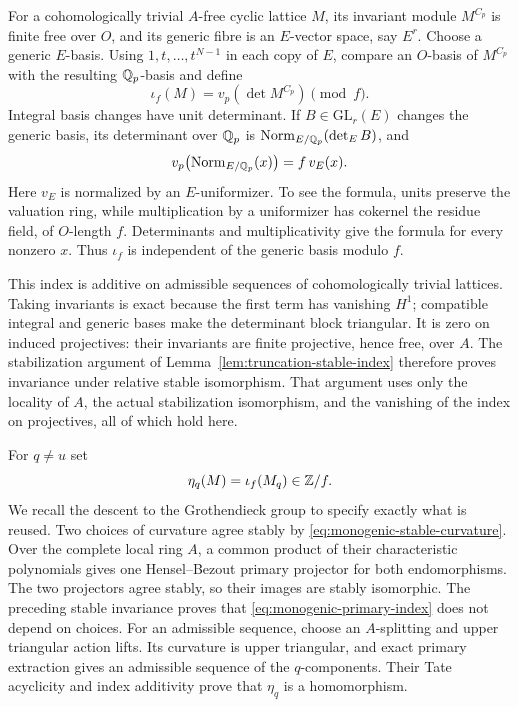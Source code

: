 For a cohomologically trivial $A$-free cyclic lattice $M$, its invariant
module $M^{C_p}$ is finite free over $O$, and its generic fibre is
an $E$-vector space, say $E^r$.  Choose a generic $E$-basis.  Using
$1,t,\ldots,t^{N-1}$ in each copy of $E$, compare an $O$-basis of
$M^{C_p}$ with the resulting $\mathbb Q_p$-basis and define
\[
 \iota_f(M)=v_p(\det M^{C_p})\pmod f.
\]
Integral basis changes have unit determinant.  If $B\in\mathrm{GL}_r(E)$
changes the generic basis, its determinant over $\mathbb Q_p$ is
$\operatorname{Norm}_{E/\mathbb Q_p}(\det_E B)$, and
\begin{equation}\label{eq:monogenic-norm-valuation}
 v_p\bigl(\operatorname{Norm}_{E/\mathbb Q_p}(x)\bigr)=f\,v_E(x).
\end{equation}
Here $v_E$ is normalized by an $E$-uniformizer.  To see the formula,
units preserve the valuation ring, while multiplication by a
uniformizer has cokernel the residue field, of $O$-length $f$.
Determinants and multiplicativity give the formula for every nonzero
$x$.  Thus $\iota_f$ is independent of the generic basis modulo $f$.

This index is additive on admissible sequences of cohomologically
trivial lattices.  Taking invariants is exact because the first term
has vanishing $H^1$; compatible integral and generic bases make the
determinant block triangular.  It is zero on induced projectives:
their invariants are finite projective, hence free, over $A$.
The stabilization argument of
Lemma~\ref{lem:truncation-stable-index} therefore proves invariance
under relative stable isomorphism.  That argument uses only the
locality of $A$, the actual stabilization isomorphism, and the
vanishing of the index on projectives, all of which hold here.

For $q\ne u$ set
\begin{equation}\label{eq:monogenic-primary-index}
 \eta_q(M)=\iota_f(M_q)\in\mathbb Z/f.
\end{equation}
We recall the descent to the Grothendieck group to specify exactly
what is reused.  Two choices of curvature agree stably by
\eqref{eq:monogenic-stable-curvature}.  Over the complete local ring
$A$, a common product of their characteristic polynomials gives one
Hensel--Bezout primary projector for both endomorphisms.  The two
projectors agree stably, so their images are stably isomorphic.
The preceding stable invariance proves that \eqref{eq:monogenic-primary-index}
does not depend on choices.  For an admissible sequence, choose an
$A$-splitting and upper triangular action lifts.  Its curvature is
upper triangular, and exact primary extraction gives an admissible
sequence of the $q$-components.  Their Tate acyclicity and index
additivity prove that $\eta_q$ is a homomorphism.

